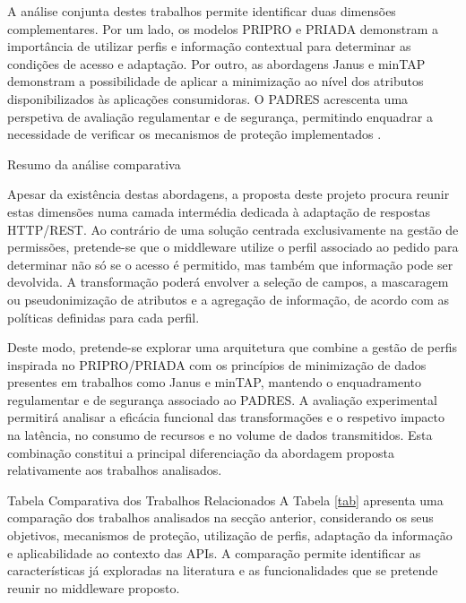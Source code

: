 \documentclass[12pt,reqno, twoside]{amsbook}
\makeatletter
\def\section{\@startsection{section}{1}%
      \z@{.5\linespacing\@plus.7\linespacing}{.25\linespacing}%
      {\normalfont\bfseries\flushleft}}
\def\subsection{\@startsection{subsection}{2}%
      \z@{.5\linespacing\@plus.7\linespacing}{.25\linespacing}%
      {\normalfont\bfseries\flushleft}}
\theoremstyle{plain}
\numberwithin{equation}{chapter}
\numberwithin{table}{chapter}
\numberwithin{figure}{chapter}
\numberwithin{section}{chapter}
\makeatother
\begin{document}
A análise conjunta destes trabalhos permite identificar duas dimensões complementares. Por um lado, os modelos PRIPRO e PRIADA demonstram a importância de utilizar perfis e informação contextual para determinar as condições de acesso e adaptação. Por outro, as abordagens Janus e minTAP demonstram a possibilidade de aplicar a minimização ao nível dos atributos disponibilizados às aplicações consumidoras. O PADRES acrescenta uma perspetiva de avaliação regulamentar e de segurança, permitindo enquadrar a necessidade de verificar os mecanismos de proteção implementados \cite{cesconetto2020,lopes2020priada,pereira2022,pallas2022janus,chen2022mintap}.

\subsection{Resumo da análise comparativa}

Apesar da existência destas abordagens, a proposta deste projeto procura reunir estas dimensões numa camada intermédia dedicada à adaptação de respostas HTTP/REST. Ao contrário de uma solução centrada exclusivamente na gestão de permissões, pretende-se que o middleware utilize o perfil associado ao pedido para determinar não só se o acesso é permitido, mas também que informação pode ser devolvida. A transformação poderá envolver a seleção de campos, a mascaragem ou pseudonimização de atributos e a agregação de informação, de acordo com as políticas definidas para cada perfil.

Deste modo, pretende-se explorar uma arquitetura que combine a gestão de perfis inspirada no PRIPRO/PRIADA com os princípios de minimização de dados presentes em trabalhos como Janus e minTAP, mantendo o enquadramento regulamentar e de segurança associado ao PADRES. A avaliação experimental permitirá analisar a eficácia funcional das transformações e o respetivo impacto na latência, no consumo de recursos e no volume de dados transmitidos. Esta combinação constitui a principal diferenciação da abordagem proposta relativamente aos trabalhos analisados.

\section{Tabela Comparativa dos Trabalhos Relacionados}
A Tabela \ref{tab} apresenta uma comparação dos trabalhos analisados na secção anterior, considerando os seus objetivos, mecanismos de proteção, utilização de perfis, adaptação da informação e aplicabilidade ao contexto das APIs. A comparação permite identificar as características já exploradas na literatura e as funcionalidades que se pretende reunir no middleware proposto.
\end{document}
